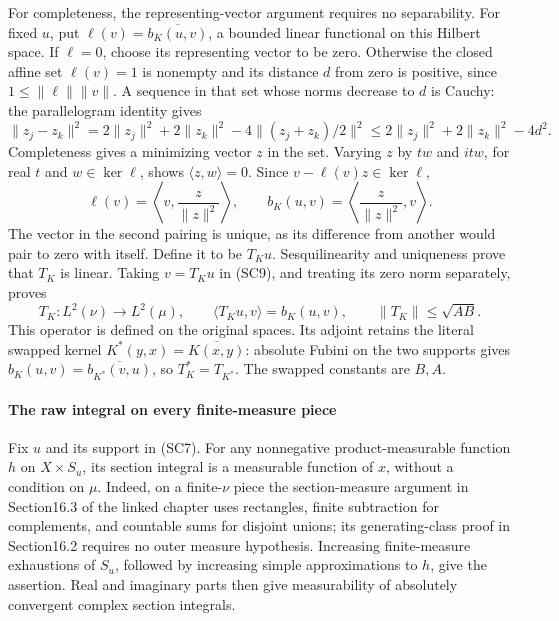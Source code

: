 \documentclass[
  11pt,
]{article}
\begin{document}
For completeness, the representing-vector argument requires no
separability. For fixed \(u\), put \(\ell(v)=\overline{b_K(u,v)}\), a
bounded linear functional on this Hilbert space. If \(\ell=0\), choose
its representing vector to be zero. Otherwise the closed affine set
\(\ell(v)=1\) is nonempty and its distance \(d\) from zero is positive,
since \(1\leq\|\ell\|\|v\|\). A sequence in that set whose norms
decrease to \(d\) is Cauchy: the parallelogram identity gives \[
 \|z_j-z_k\|^2
 =2\|z_j\|^2+2\|z_k\|^2-4\|(z_j+z_k)/2\|^2
 \leq2\|z_j\|^2+2\|z_k\|^2-4d^2 .
 \tag{SC11}
\] Completeness gives a minimizing vector \(z\) in the set. Varying
\(z\) by \(tw\) and \(itw\), for real \(t\) and \(w\in\ker\ell\), shows
\(\langle z,w\rangle=0\). Since \(v-\ell(v)z\in\ker\ell\), \[
 \ell(v)=\left\langle v,\frac{z}{\|z\|^2}\right\rangle,\qquad
 b_K(u,v)=\left\langle\frac{z}{\|z\|^2},v\right\rangle .
 \tag{SC12}
\] The vector in the second pairing is unique, as its difference from
another would pair to zero with itself. Define it to be \(T_Ku\).
Sesquilinearity and uniqueness prove that \(T_K\) is linear. Taking
\(v=T_Ku\) in (SC9), and treating its zero norm separately, proves \[
 T_K:L^2(\nu)\longrightarrow L^2(\mu),\qquad
 \langle T_Ku,v\rangle=b_K(u,v),\qquad
 \|T_K\|\leq\sqrt{AB}.
 \tag{SC13}
\] This operator is defined on the original spaces. Its adjoint retains
the literal swapped kernel \(K^*(y,x)=\overline{K(x,y)}\): absolute
Fubini on the two supports gives \(b_K(u,v)=\overline{b_{K^*}(v,u)}\),
so \(T_K^*=T_{K^*}\). The swapped constants are \(B,A\).

\paragraph{The raw integral on every finite-measure
piece}\label{the-raw-integral-on-every-finite-measure-piece}

Fix \(u\) and its support in (SC7). For any nonnegative
product-measurable function \(h\) on \(X\times S_u\), its section
integral is a measurable function of \(x\), without a condition on
\(\mu\). Indeed, on a finite-\(\nu\) piece the section-measure argument
in Section16.3 of the linked chapter uses rectangles, finite subtraction
for complements, and countable sums for disjoint unions; its
generating-class proof in Section16.2 requires no outer measure
hypothesis. Increasing finite-measure exhaustions of \(S_u\), followed
by increasing simple approximations to \(h\), give the assertion. Real
and imaginary parts then give measurability of absolutely convergent
complex section integrals.
\end{document}
